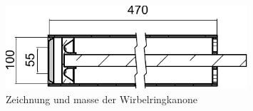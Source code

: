 \begin{figure}
\centering
\includegraphics[width=0.8\textwidth]{papers/wirbelringe/fig/zeichnung.pdf}
\caption{Zeichnung und masse der Wirbelringkanone \cite{Wirbelringe:3D_modelle} \label{buch:papers:Wirbelringe:fig:zeichnung}}
\end{figure}